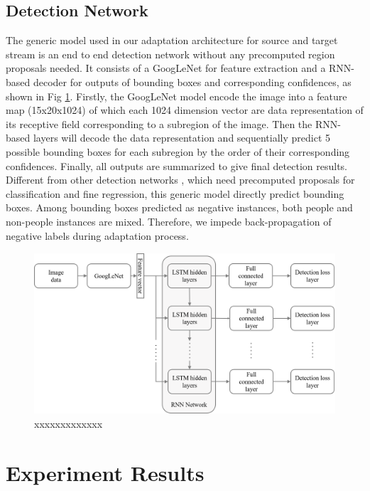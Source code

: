 \documentclass[runningheads]{llncs}
\begin{document}
\subsection{Detection Network}
\label{section:Detection Network}
The generic model \cite{stewart2015end} used in our adaptation architecture for source and target stream is an end to end detection network without any precomputed region proposals needed. It consists of a GoogLeNet \cite{szegedy2015going} for feature extraction and a RNN-based decoder for outputs of bounding boxes and corresponding confidences, as shown in Fig \ref{fig:reinspect}. Firstly, the GoogLeNet model encode the image into a feature map (15x20x1024) of which each 1024 dimension vector are data representation of its receptive field corresponding to a subregion of the image. Then the RNN-based layers will decode the data representation and sequentially predict 5 possible bounding boxes for each subregion by the order of their corresponding confidences. Finally, all outputs are summarized to give final detection results. Different from other detection networks \cite{girshick2015fast,vu2015context}, which need precomputed proposals for classification and fine regression, this generic model directly predict bounding boxes. Among bounding boxes predicted as negative instances, both people and non-people instances are mixed. Therefore, we impede back-propagation of negative labels during adaptation process.

\begin{figure}
\centering
\includegraphics[height=6cm]{images/reinspect.png}
\caption{xxxxxxxxxxxxx}
\label{fig:reinspect}
\end{figure}


\section{Experiment Results}
\label{section:Experiment Results}
\end{document}
